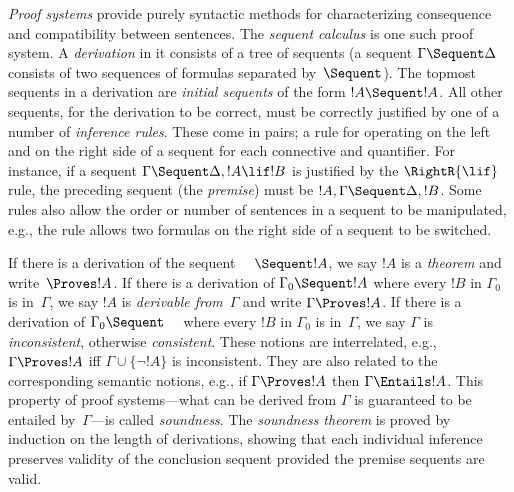 \emph{Proof systems} provide purely syntactic methods for
characterizing consequence and compatibility between sentences.
The \emph{sequent calculus} is one such proof
system. A \emph{derivation} in it consists of a tree of sequents (a
sequent $\Gamma \Sequent \Delta$ consists of two sequences of formulas
separated by~$\Sequent$). The topmost sequents in a derivation
are \emph{initial sequents} of the form $!A \Sequent !A$.  All other
sequents, for the derivation to be correct, must be correctly
justified by one of a number of \emph{inference rules}. These come in
pairs; a rule for operating on the left and on the right side of a
sequent for each connective and quantifier. For instance, if a sequent
$\Gamma \Sequent \Delta, !A \lif !B$ is justified by the
$\RightR{\lif}$ rule, the preceding sequent (the \emph{premise}) must
be $!A, \Gamma \Sequent \Delta, !B$. Some rules also allow the order
or number of sentences in a sequent to be manipulated, e.g.,
the \RightR{\Exchange} rule allows two formulas on the right side of a
sequent to be switched.

If there is a derivation of the sequent $\quad \Sequent !A$, we say
$!A$ is a \emph{theorem} and write~$\Proves !A$. If there is a
derivation of $\Gamma_0 \Sequent !A$ where every $!B$ in $\Gamma_0$ is
in~$\Gamma$, we say $!A$ is \emph{derivable from}~$\Gamma$ and write
$\Gamma \Proves !A$. If there is a derivation of
$\Gamma_0 \Sequent \quad$ where every $!B$ in $\Gamma_0$ is
in~$\Gamma$, we say $\Gamma$ is \emph{inconsistent}, otherwise
\emph{consistent}. These notions are interrelated, e.g., $\Gamma
\Proves !A$ iff $\Gamma \cup \{\lnot !A\}$ is inconsistent. They are
also related to the corresponding semantic notions, e.g., if $\Gamma
\Proves !A$ then $\Gamma \Entails !A$. This property of proof
systems---what can be derived from $\Gamma$ is guaranteed to be
entailed by~$\Gamma$---is called \emph{soundness}. The \emph{soundness
theorem} is proved by induction on the length of derivations, showing
that each individual inference preserves validity of the conclusion
sequent provided the premise sequents are valid.
